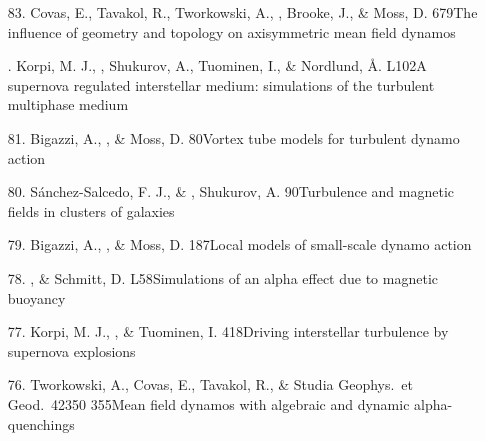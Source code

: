\begin{itemize}
\item[83.]
Covas, E., Tavakol, R., Tworkowski, A., \Brandenburg,
Brooke, J., \& Moss, D.
{679}{The influence of geometry and topology on axisymmetric mean field
dynamos}

\item[\important 82.]
Korpi, M. J., \Brandenburg, Shukurov, A., Tuominen, I.,
\& Nordlund, \AA.
{L102}{A supernova regulated interstellar medium: simulations of the
turbulent multiphase medium}

\item[81.]
Bigazzi, A., \Brandenburg, \& Moss, D.
{80}{Vortex tube models for turbulent dynamo action}

\item[80.]
S\'{a}nchez-Salcedo, F. J., \& \Brandenburg,
Shukurov, A.
{90}{Turbulence and magnetic fields in clusters of galaxies}

\item[79.]
Bigazzi, A., \Brandenburg, \& Moss, D.
{187}{Local models of small-scale dynamo action}

\item[78.]
\Brandenburg, \& Schmitt, D.
{L58}{Simulations of an alpha effect due to magnetic buoyancy}

\item[77.]
Korpi, M. J., \Brandenburg, \& Tuominen, I.
{418}{Driving interstellar turbulence by supernova explosions}

\item[76.]
Tworkowski, A., Covas, E., Tavakol, R., \& \Brandenburg{}
{Studia Geophys.\ et Geod.\ }{42}{350}
{355}{Mean field dynamos with algebraic and dynamic alpha-quenchings}


\end{itemize}
